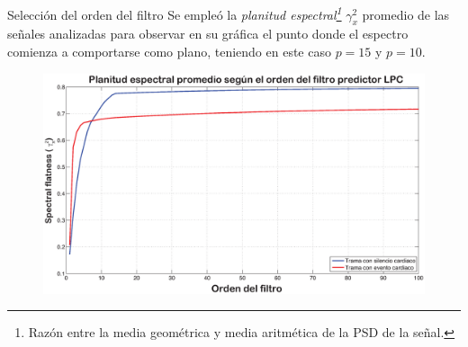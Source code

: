 \documentclass[xcolor=table]{beamer}
\begin{document}
\begin{frame}{Selecci\'on del orden del filtro}
	Se emple\'o la \emph{planitud espectral\footnote{Raz\'on entre la media geom\'etrica y media aritm\'etica de la PSD de la se\~nal.}} $\gamma_{x}^{2}$ promedio de las se\~nales analizadas para observar en su gr\'afica el punto donde el espectro comienza a comportarse como plano, teniendo en este caso $p=15$ y $p=10$.
	\begin{figure}
		\centering
		\includegraphics[scale=0.22]{sfm.eps}
	\end{figure}	
\end{frame}
%
%
\end{document}
